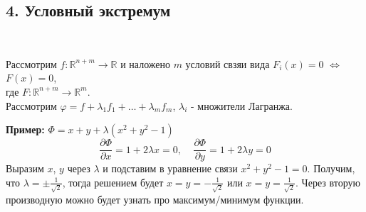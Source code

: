 \documentclass[book, 11pt]{report}
\begin{document}
\subsection*{4. Условный экстремум}
\par{\ }
\par{Рассмотрим $f:\mathbb{R}^{n+m}\to\mathbb{R}$ и наложено $m$ условий свзяи вида $F_i(x)=0$ $\Leftrightarrow$ $F(x)=0$, \\ где $F:\mathbb{R}^{n+m}\to\mathbb{R}^m$. \\
Рассмотрим $\varphi=f+\lambda_1 f_1+\ldots+\lambda_mf_m$, $\lambda_i$ - множители Лагранжа.
}
\vspace{0.5cm}
\par{\textbf{Пример: }$\Phi=x+y+\lambda(x^2+y^2-1)$\\
\begin{equation*}
    \frac{\partial\Phi}{\partial x}=1+2\lambda x=0, \ \ \ \ \ \frac{\partial\Phi}{\partial y}=1+2\lambda y=0
\end{equation*}
Выразим $x$, $y$ через $\lambda$ и подставим в уравнение связи $x^2+y^2-1=0$. Получим, что $\lambda=\pm\frac{1}{\sqrt{2}}$, тогда решением будет $x=y=-\frac{1}{\sqrt{2}}$ или $x=y=\frac{1}{\sqrt{2}}$. Через вторую производную можно будет узнать про максимум/минимум функции.
}
\end{document}
